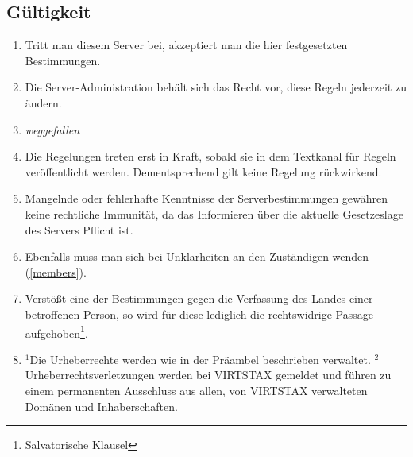 \documentclass{article}
\begin{document}
\subsection{Gültigkeit}
\begin{enumerate}[(1)]
	\item Tritt man diesem Server bei, akzeptiert man die hier festgesetzten Bestimmungen.
	\item Die Server-Administration behält sich das Recht vor, diese Regeln jederzeit zu ändern.
	\item \textit{weggefallen}
	\item Die Regelungen treten erst in Kraft, sobald sie in dem Textkanal für Regeln veröffentlicht werden. Dementsprechend gilt keine Regelung rückwirkend.
	\item Mangelnde oder fehlerhafte Kenntnisse der Serverbestimmungen gewähren keine rechtliche Immunität, da das Informieren über die aktuelle Gesetzeslage des Servers Pflicht ist.
	\item Ebenfalls muss man sich bei Unklarheiten an den Zuständigen wenden (\ref{members}).
	\item Verstößt eine der Bestimmungen gegen die Verfassung des Landes einer betroffenen Person, so wird für diese lediglich die rechtswidrige Passage aufgehoben\footnote{Salvatorische Klausel}.
	\item $^{1}$Die Urheberrechte werden wie in der Präambel beschrieben verwaltet. $^{2}$Urheberrechtsverletzungen werden bei VIRTSTAX gemeldet und führen zu einem permanenten Ausschluss aus allen, von
	VIRTSTAX verwalteten Domänen und Inhaberschaften.
\end{enumerate}
\end{document}
